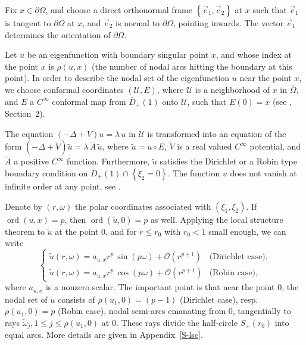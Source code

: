 \documentclass[12pt,a4paper]{amsart}
\theoremstyle{plain} %
\theoremstyle{definition}
\numberwithin{equation}{section}
\numberwithin{figure}{section}
\numberwithin{table}{section}
\newcommand{\cO}{\mathcal{O}}
\newcommand{\cU}{\mathcal{U}}
\DeclareMathOperator{\ord}{ord}
\newcommand{\wb}[1]{\overline{#1}}
\newcommand{\set}[1]{\left\lbrace #1 \right\rbrace}
\begin{document}
{Fix $x \in \partial\Omega$, and choose a direct orthonormal frame $\set{\vec{e}_1,\vec{e}_2}$ at $x$ such that $\vec{e}_1$ is tangent to $\partial \Omega$ at $x$, and $\vec{e}_2$ is normal to $\partial \Omega$, pointing inwards. The vector $\vec{e}_1$ determines the orientation of $\partial \Omega$.\smallskip

Let $u$ be an eigenfunction with boundary singular point $x$, and whose index at the point $x$ is $\rho(u,x)$ (the number of nodal arcs hitting the boundary at this point). In order to describe the nodal set of the eigenfunction $u$ near the point $x$, we choose conformal coordinates $(\cU, E)$, where $\cU$ is a neighborhood of $x$ in $\wb{\Omega}$, and $E$  a $C^{\infty}$ conformal map from $\wb{D}_{+}(1)$ onto $\cU$, such that $E(0) = x$ (see \cite{YaZh2021}, Section~2).\smallskip

The equation $(-\Delta + V) u = \lambda\, u$ in $\cU$ is transformed into an equation of the form $(-\Delta + \tilde{V}) \tilde{u} = \lambda\, \tilde{A}\, \tilde{u}$, where $\tilde{u} = u \circ E$, $\tilde{V}$ is a real valued $C^{\infty}$ potential, and $\tilde{A}$ a positive $C^{\infty}$ function. Furthermore, $\tilde{u}$ satisfies the Dirichlet or a Robin type boundary condition on $\wb{D}_{+}(1)\cap \set{\xi_2=0}$.  The function $u$ does not vanish at infinite order at any point, see \cite{DoFe1990a}.\smallskip

Denote by $(r,\omega)$ the polar coordinates associated with $(\xi_1,\xi_2)$. If $\ord(u,x) = p$, then $\ord(\tilde{u},0) = p$ as well. Applying the local structure theorem to $\tilde{u}$ at the point $0$, and for $ r \le r_0$ with $r_0 < 1$ small enough, we can write
%
\begin{equation}\label{E-hmn-21b5}
\left\{
\begin{array}{ll}
\tilde{u}(r,\omega) = a_{u,x} r^p \, \sin(p\omega) + \cO(r^{p+1}) &\text{(Dirichlet case)},\\[5pt]
\tilde{u}(r,\omega) = a_{u,x} r^p \, \cos(p\omega) + \cO(r^{p+1}) &\text{(Robin case)},
\end{array}
\right.
\end{equation}
%
where $a_{u,x}$ is a nonzero scalar. The important point is that near the point $0$, the nodal set of $\tilde{u}$ consists of $\rho(u_1,0) = (p-1)$ (Dirichlet case), resp. $\rho(u_1,0) = p$ (Robin case), nodal semi-arcs emanating from $0$, tangentially to rays $\tilde{\omega}_j, 1 \le j \le \rho(u_1,0)$ at $0$. These rays divide the half-circle $S_{+}(r_0)$ into equal arcs. More details are given in Appendix~\ref{S-lsc}. \smallskip

}
\end{document}

